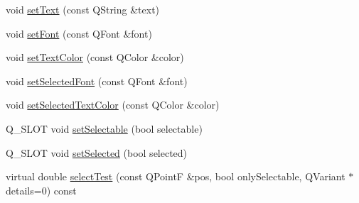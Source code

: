 \begin{DoxyCompactItemize}
\item 
void \hyperlink{classQCPPlotTitle_aae5a93e88050dfb2cbf6adc087516821}{set\-Text} (const \-Q\-String \&text)
\item 
void \hyperlink{classQCPPlotTitle_a199fc7170802ea65006c371875349e37}{set\-Font} (const \-Q\-Font \&font)
\item 
void \hyperlink{classQCPPlotTitle_a71273e3a0ca6b4c151591b37b9e5ce33}{set\-Text\-Color} (const \-Q\-Color \&color)
\item 
void \hyperlink{classQCPPlotTitle_a5245980ead999ceed51dbe702d0e3131}{set\-Selected\-Font} (const \-Q\-Font \&font)
\item 
void \hyperlink{classQCPPlotTitle_a09ffd8c52ac8824d00382f84be391b66}{set\-Selected\-Text\-Color} (const \-Q\-Color \&color)
\item 
\-Q\-\_\-\-S\-L\-O\-T void \hyperlink{classQCPPlotTitle_a8866b07b9fa14877d4cefbf38406c5dd}{set\-Selectable} (bool selectable)
\item 
\-Q\-\_\-\-S\-L\-O\-T void \hyperlink{classQCPPlotTitle_a8d441a889d371307df86f1ab7687a333}{set\-Selected} (bool selected)
\item 
virtual double \hyperlink{classQCPPlotTitle_a5b7ae716be9134a48f4e378feb0e6699}{select\-Test} (const \-Q\-Point\-F \&pos, bool only\-Selectable, \-Q\-Variant $\ast$details=0) const 
\end{DoxyCompactItemize}

